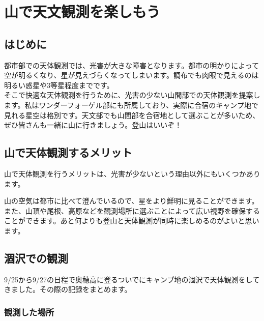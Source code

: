 \documentclass[../main]{subfiles}
\begin{document}
\chapter{山で天文観測を楽しもう} %


\section{はじめに}
都市部での天体観測では、光害が大きな障害となります。都市の明かりによって空が明るくなり、星が見えづらくなってしまいます。調布でも肉眼で見えるのは明るい惑星や3等星程度までです。\\
そこで快適な天体観測を行うために、光害の少ない山間部での天体観測を提案します。私はワンダーフォーゲル部にも所属しており、実際に合宿のキャンプ地で見れる星空は格別です。天文部でも山間部を合宿地として選ぶことが多いため、ぜひ皆さんも一緒に山に行きましょう。登山はいいぞ！

\section{山で天体観測するメリット}
山で天体観測を行うメリットは、光害が少ないという理由以外にもいくつかあります。

山の空気は都市に比べて澄んでいるので、星をより鮮明に見ることができます。また、山頂や尾根、高原などを観測場所に選ぶことによって広い視野を確保することができます。あと何よりも登山と天体観測が同時に楽しめるのがよいと思います。

\section{涸沢での観測}

9/25から9/27の日程で奥穂高に登るついでにキャンプ地の涸沢で天体観測をしてきました。その際の記録をまとめます。

\subsection{観測した場所}
\end{document}
